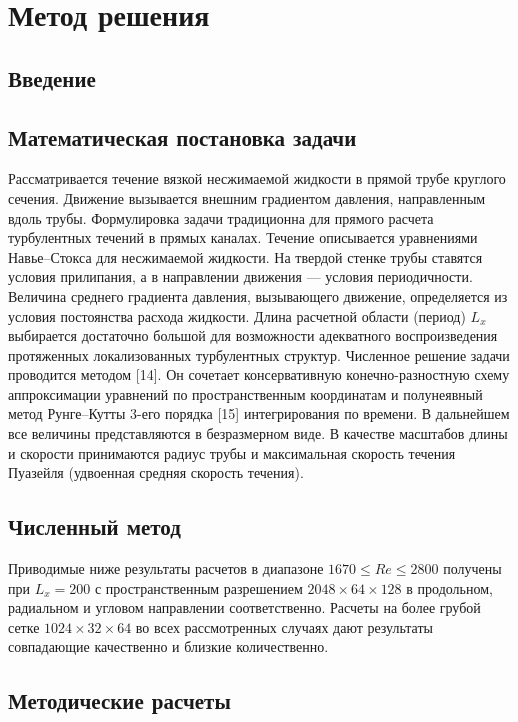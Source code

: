 
\chapter{Метод решения}

\section{Введение}

\section{Математическая постановка задачи}

Рассматривается течение вязкой несжимаемой жидкости в прямой трубе круглого сечения. Движение вызывается внешним градиентом давления, направленным вдоль трубы. Формулировка задачи традиционна для прямого расчета турбулентных течений в прямых каналах. Течение описывается уравнениями Навье--Стокса для несжимаемой жидкости. На твердой стенке трубы ставятся условия прилипания, а в направлении движения --- условия периодичности. Величина среднего градиента давления, вызывающего движение, определяется из условия постоянства расхода жидкости. Длина расчетной области (период) $L_x$ выбирается достаточно большой для возможности адекватного воспроизведения протяженных локализованных турбулентных структур. Численное решение задачи проводится методом [14]. Он сочетает консервативную конечно-разностную схему аппроксимации уравнений по пространственным координатам и полунеявный метод Рунге--Кутты 3-его порядка [15] интегрирования по времени. В дальнейшем все величины представляются в безразмерном виде. В качестве масштабов длины и скорости принимаются радиус трубы и максимальная скорость течения Пуазейля (удвоенная средняя скорость течения). 


\section{Численный метод}

Приводимые ниже результаты расчетов в диапазоне $1670\leqslant Re\leqslant 2800$ получены при $L_x=200$ с пространственным разрешением $2048\times64\times128$ в продольном, радиальном и угловом направлении соответственно. Расчеты на более грубой сетке $1024\times32\times64$ во всех рассмотренных случаях дают результаты совпадающие качественно и близкие количественно.


\section{Методические расчеты}

